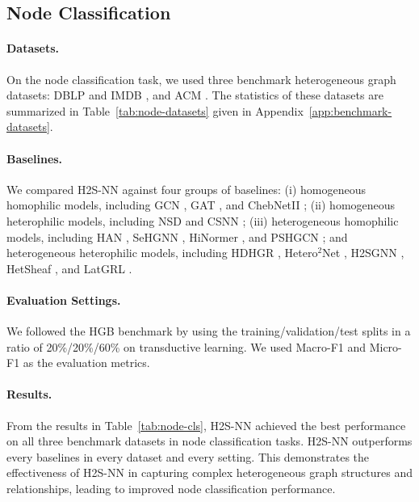 \documentclass[sigconf,anonymous,review]{acmart}
\newcommand{\method}{\textsc{H2S-NN}}
\begin{document}
\subsection{Node Classification}
\label{sec:setup-node}


\paragraph{Datasets.}
On the node classification task, we used three benchmark heterogeneous graph datasets: DBLP \cite{lv2021hgb} and IMDB \cite{lv2021hgb}, and ACM \cite{wang2019han}. The statistics of these datasets are summarized in Table~\ref{tab:node-datasets} given in
Appendix~\ref{app:benchmark-datasets}.


\paragraph{Baselines.} We compared \method{} against four groups of baselines: (i) homogeneous homophilic models, including GCN
\cite{kipf2017gcn}, GAT \cite{velickovic2018gat}, and ChebNetII \cite{he2022chebnetii}; (ii) homogeneous heterophilic models, including NSD
\cite{bodnar2022neural} and CSNN \cite{ribeiro2026cooperative}; (iii)
heterogeneous homophilic models, including HAN \cite{wang2019han}, SeHGNN \cite{yang2023sehgnn},
HiNormer \cite{mao2023hinormer}, and PSHGCN \cite{he2024spectral}; and heterogeneous heterophilic models, including HDHGR \cite{guo2023homophily}, Hetero$^2$Net \cite{li2025hetero2net}, H2SGNN
\cite{lu2026addressing}, HetSheaf \cite{braithwaite2024heterogeneous}, and LatGRL
\cite{shen2025heterophily}.


\paragraph{Evaluation Settings.} We followed the HGB benchmark \cite{lv2021hgb} by using the training/validation/test splits in a ratio of 20\%/20\%/60\% on transductive learning. We used Macro-F1 and Micro-F1 as the evaluation metrics.

\paragraph{Results.}
From the results in Table~\ref{tab:node-cls}, \method{} achieved the best performance on all three benchmark datasets in node classification tasks. \method{} outperforms every baselines in every dataset and every setting. This demonstrates the effectiveness of \method{} in capturing complex heterogeneous graph structures and relationships, leading to improved node classification performance.
\end{document}
